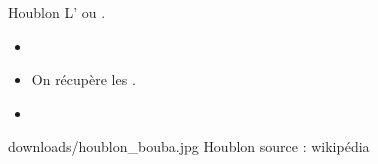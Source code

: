 \label{houblon}
\ficheidentiteplante
{Houblon}
{%
    L' ou  .
}
{%
    \begin{itemize}[label = \bcplume]
        \item
    \end{itemize}
}
{%
    \begin{itemize}[label = \bcplume]
        \item On récupère les .
        \item 
    \end{itemize}
}
{%
    \begin{itemize}[label = \bccrayon]
        
    \end{itemize}
}
{%
    
}
{%
    downloads/houblon_bouba.jpg
}
{%
    Houblon
}
{%
    source : wikipédia
}

